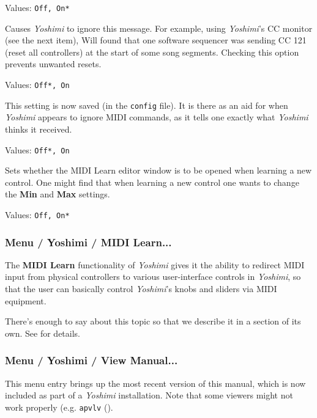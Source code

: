    Values: \texttt{Off, On*}

   Causes \textsl{Yoshimi} to ignore this message.
   For example, using \textsl{Yoshimi}'s CC monitor (see the next
   item), Will found that one software sequencer was sending CC 121 (reset all
   controllers) at the start of some song segments.  Checking this option
   prevents unwanted resets.

   Values: \texttt{Off*, On}

   This setting is now saved (in the \texttt{config} file). It is there
   as an aid for when \textsl{Yoshimi} appears to ignore MIDI commands,
   as it tells one exactly what \textsl{Yoshimi} thinks it received.

   Values: \texttt{Off*, On}

   Sets whether the MIDI Learn editor window is to be opened when learning a
   new control. One might find that when learning a new control one
   wants to change the \textbf{Min} and \textbf{Max} settings.

   Values: \texttt{Off, On*}

\subsubsection{Menu / Yoshimi / MIDI Learn...}
\label{subsubsec:menu_yoshimi_midi_learn}

   The \textbf{MIDI Learn} functionality of \textsl{Yoshimi} gives it the
   ability to redirect MIDI input from physical controllers to various
   user-interface controls in \textsl{Yoshimi}, so that the user can basically
   control \textsl{Yoshimi}'s knobs and sliders via MIDI equipment.

   There's enough to say about this topic so that we describe it in a section
   of its own.
   See \hspace{4pt}for details.

\subsubsection{Menu / Yoshimi / View Manual...}
\label{subsubsec:menu_yoshimi_view_manual}

   This menu entry brings up the most recent version of this manual, which is
   now included as part of a \textsl{Yoshimi} installation.
   Note that some viewers might not work properly
   (e.g. \texttt{apvlv} (\cite{apvlv}).

